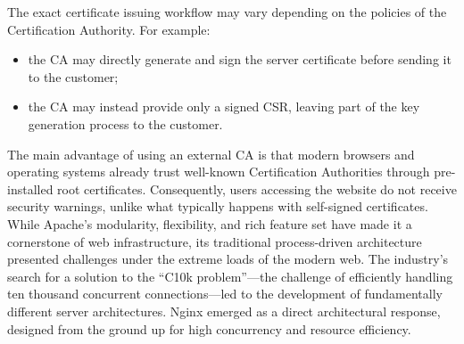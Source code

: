 \documentclass{scrbook}
\begin{document}
	The exact certificate issuing workflow may vary depending on the policies of the Certification Authority. For example:
	\begin{itemize}
		\item the CA may directly generate and sign the server certificate before sending it to the customer;
		\item the CA may instead provide only a signed CSR, leaving part of the key generation process to the customer.
	\end{itemize}
	
	The main advantage of using an external CA is that modern browsers and operating systems already trust well-known Certification Authorities through pre-installed root certificates. Consequently, users accessing the website do not receive security warnings, unlike what typically happens with self-signed certificates.\\
	
	While Apache's modularity, flexibility, and rich feature set have made it a cornerstone of web infrastructure, its traditional process-driven architecture presented challenges under the extreme loads of the modern web. The industry's search for a solution to the ``C10k problem''---the challenge of efficiently handling ten thousand concurrent connections---led to the development of fundamentally different server architectures. Nginx emerged as a direct architectural response, designed from the ground up for high concurrency	and resource efficiency.
\end{document}
